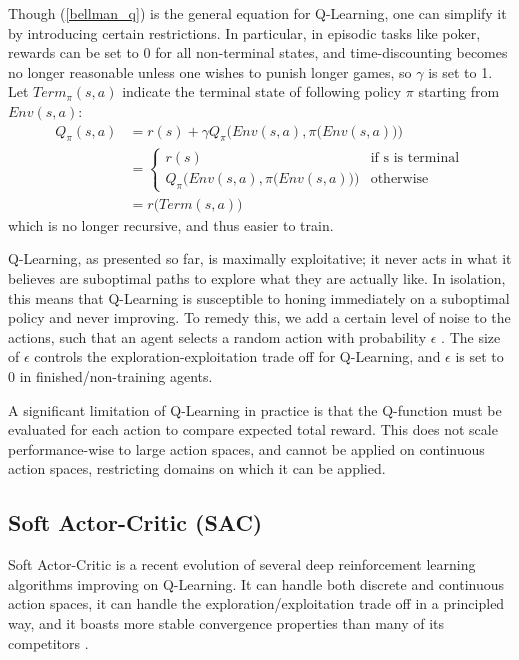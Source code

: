 Though (\ref{bellman_q}) is the general equation for Q-Learning, one can simplify it by introducing certain restrictions. In particular, in episodic tasks like poker, rewards can be set to 0 for all non-terminal states, and time-discounting becomes no longer reasonable unless one wishes to punish longer games, so $\gamma$ is set to 1. Let $Term_{\pi}(s, a)$ indicate the terminal state of following policy $\pi$ starting from $Env(s, a)$:
\begin{equation}
\label{Qlearn_nobellman}
\begin{split}
Q_{\pi}(s, a) &= r(s) + \gamma Q_{\pi}\Big(Env(s, a), \pi\big(Env(s, a)\big)\Big)\\
&= \begin{cases}
r(s) &\mbox{if s is terminal} \\
Q_{\pi}\Big(Env(s, a), \pi\big(Env(s, a)\big)\Big) &\mbox{otherwise}
\end{cases}\\
&= r\big(Term(s, a)\big)
\end{split}
\end{equation}
which is no longer recursive, and thus easier to train.

Q-Learning, as presented so far, is maximally exploitative; it never acts in what it believes are suboptimal paths to explore what they are actually like. In isolation, this means that Q-Learning is susceptible to honing immediately on a suboptimal policy and never improving. To remedy this, we add a certain level of noise to the actions, such that an agent selects a random action with probability $\epsilon$ \cite[chapters 2.2 \& 2.3]{Sutton}. The size of $\epsilon$ controls the exploration-exploitation trade off for Q-Learning, and $\epsilon$ is set to 0 in finished/non-training agents.

A significant limitation of Q-Learning in practice is that the Q-function must be evaluated for each action to compare expected total reward. This does not scale performance-wise to large action spaces, and cannot be applied on continuous action spaces, restricting domains on which it can be applied.

\subsection{Soft Actor-Critic (SAC)}

Soft Actor-Critic is a recent evolution of several deep reinforcement learning algorithms improving on Q-Learning. It can handle both discrete and continuous action spaces, it can handle the exploration/exploitation trade off in a principled way, and it boasts more stable convergence properties than many of its competitors \cite{SAC_main}.

